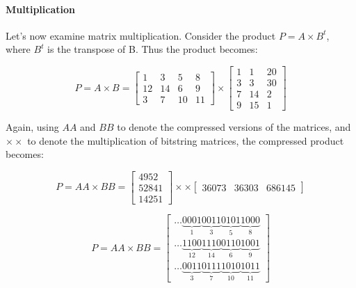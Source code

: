 \documentclass[12pt]{article}
\begin{document}
\paragraph{Multiplication}

Let's now examine matrix multiplication. Consider the product $P = A \times
B^{t}$, where $B^t$ is the transpose of B. Thus the product becomes:

\begin{equation}
	P = A \times B = \begin{bmatrix}
		1 & 3 & 5 & 8\\ 
		12 &14  & 6 & 9\\ 
		3 & 7 & 10 & 11
		\end{bmatrix}
        \times
		\begin{bmatrix}
		  1 & 1  & 20\\ 
		  3 & 3  & 30\\
		  7 & 14 & 2\\
		  9 & 15 & 1
		\end{bmatrix}
\end{equation}

Again, using $AA$ and $BB$ to denote the compressed versions of the matrices,
and $\times\times$ to denote the multiplication of bitstring matrices, the
compressed product becomes:

\begin{equation}\label{eq:prodbs}
	P = AA \times BB =\begin{bmatrix}
			    4952\\ 
			    52841\\ 
			    14251
			  \end{bmatrix} 
        \times\times
	\begin{bmatrix}
	  36073 & 36303 & 686145
	\end{bmatrix}
\end{equation}

\begin{equation}
	P = AA \times BB = 
    	\begin{bmatrix}
\ldots\underbrace{0001}_{1}\underbrace{0011}_{3}\underbrace{0101}_{5}\underbrace
{1000}_{8}\\
\ldots\underbrace{1100}_{12}\underbrace{1110}_{14}\underbrace{0110}_{6}
\underbrace{1001}_{9}\\
\ldots\underbrace{0011}_{3}\underbrace{0111}_{7}\underbrace{1010}_{10}
\underbrace{1011}_{11}
	\end{bmatrix}
\end{equation}
\end{document}
